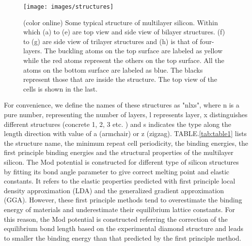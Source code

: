 \documentclass[%
 reprint,
 amsmath,amssymb,
 aps,
 prb,
]{revtex4-1}
\begin{document}
\begin{figure}[b]
\texttt{[image: images/structures]}
\caption{\label{fig:structures}  (color online) Some typical structure of multilayer silicon. Within which (a) to (e) are top view and side view of bilayer structures. (f) to (g) are side view of trilayer structures and (h) is that of four-layers. The buckling atoms on the top surface are labeled as yellow while the red atoms represent the others on the top surface. All the atoms on the bottom surface are labeled as blue. The blacks represent those that are inside the structure. The top view of the cells is shown in the last.}
\end{figure}

 For convenience, we define the names of these structures as "nlxs", where n is a pure number, representing the number of layers, l represents layer, x distinguishes different structures (concrete 1, 2, 3 etc. ) and s indicates the type along the length direction with value of a (armchair) or z (zigzag). TABLE.\ref{tab:table1} lists the structure name, the minimum repeat cell periodicity, the binding energies, the first principle binding energies and the structural properties of the multilayer silicon. The Mod potential is constructed for different type of silicon structures by fitting its bond angle parameter to give correct melting point and elastic constants. It refers to the elastic properties predicted with first principle local density approximation (LDA) and the generalized gradient approximation (GGA). However, these first principle methods tend to overestimate the binding energy of materials and underestimate their equilibrium lattice constants. For this reason, the Mod potential is constructed referring the correction of the equilibrium bond length based on the experimental diamond structure and leads to smaller the binding energy than that predicted by the first principle method.
\end{document}
